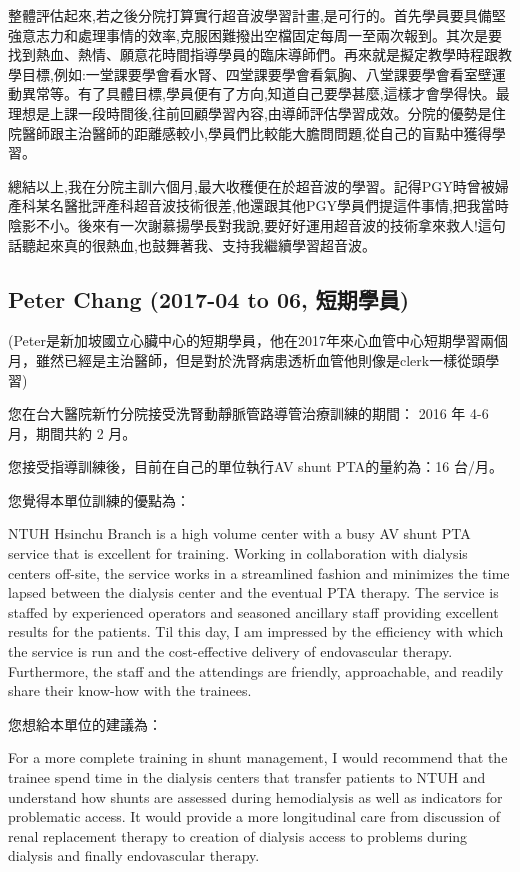 \documentclass[12pt,a4paper]{article}
\begin{document}
整體評估起來,若之後分院打算實行超音波學習計畫,是可行的。首先學員要具備堅強意志力和處理事情的效率,克服困難撥出空檔固定每周一至兩次報到。其次是要找到熱血、熱情、願意花時間指導學員的臨床導師們。再來就是擬定教學時程跟教學目標,例如:一堂課要學會看水腎、四堂課要學會看氣胸、八堂課要學會看室壁運動異常等。有了具體目標,學員便有了方向,知道自己要學甚麼,這樣才會學得快。最理想是上課一段時間後,往前回顧學習內容,由導師評估學習成效。分院的優勢是住院醫師跟主治醫師的距離感較小,學員們比較能大膽問問題,從自己的盲點中獲得學習。

總結以上,我在分院主訓六個月,最大收穫便在於超音波的學習。記得PGY時曾被婦產科某名醫批評產科超音波技術很差,他還跟其他PGY學員們提這件事情,把我當時陰影不小。後來有一次謝慕揚學長對我說,要好好運用超音波的技術拿來救人!這句話聽起來真的很熱血,也鼓舞著我、支持我繼續學習超音波。

\subsection{Peter Chang (2017-04 to 06, 短期學員)}
(Peter是新加坡國立心臟中心的短期學員，他在2017年來心血管中心短期學習兩個月，雖然已經是主治醫師，但是對於洗腎病患透析血管他則像是clerk一樣從頭學習)

您在台大醫院新竹分院接受洗腎動靜脈管路導管治療訓練的期間：
2016 年 4-6月，期間共約 2 月。

您接受指導訓練後，目前在自己的單位執行AV shunt PTA的量約為：16 台/月。

您覺得本單位訓練的優點為：

NTUH Hsinchu Branch is a high volume center with a busy AV shunt PTA service that is excellent for training. Working in collaboration with dialysis centers off-site, the service works in a streamlined fashion and minimizes the time lapsed between the dialysis center and the eventual PTA therapy. The service is staffed by experienced operators and seasoned ancillary staff providing excellent results for the patients. Til this day, I am impressed by the efficiency with which the service is run and the cost-effective delivery of endovascular therapy. Furthermore, the staff and the attendings are friendly, approachable, and readily share their know-how with the trainees.

您想給本單位的建議為：

For a more complete training in shunt management, I would recommend that the trainee spend time in the dialysis centers that transfer patients to NTUH and understand how shunts are assessed during hemodialysis as well as indicators for problematic access. It would provide a more longitudinal care from discussion of renal replacement therapy to creation of dialysis access to problems during dialysis and finally endovascular therapy.
\end{document}

